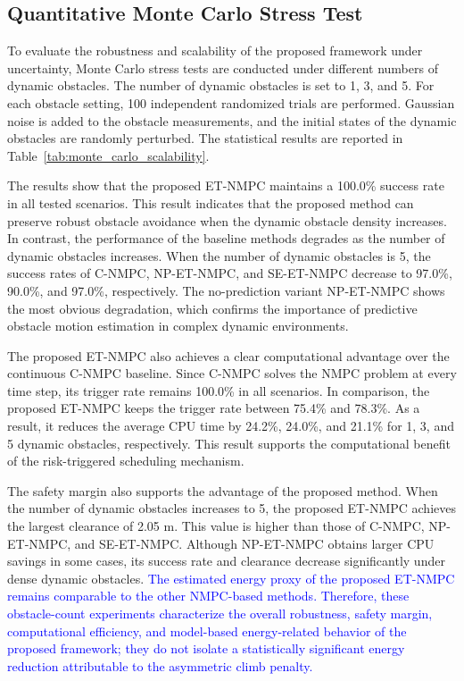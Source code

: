 \documentclass[lettersize,journal]{IEEEtran}
\begin{document}
\subsection{Quantitative Monte Carlo Stress Test}

To evaluate the robustness and scalability of the proposed framework under uncertainty, Monte Carlo stress tests are conducted under different numbers of dynamic obstacles. The number of dynamic obstacles is set to 1, 3, and 5. For each obstacle setting, 100 independent randomized trials are performed. Gaussian noise is added to the obstacle measurements, and the initial states of the dynamic obstacles are randomly perturbed. The statistical results are reported in Table~\ref{tab:monte_carlo_scalability}.

The results show that the proposed ET-NMPC maintains a 100.0\% success rate in all tested scenarios. This result indicates that the proposed method can preserve robust obstacle avoidance when the dynamic obstacle density increases. In contrast, the performance of the baseline methods degrades as the number of dynamic obstacles increases. When the number of dynamic obstacles is 5, the success rates of C-NMPC, NP-ET-NMPC, and SE-ET-NMPC decrease to 97.0\%, 90.0\%, and 97.0\%, respectively. The no-prediction variant NP-ET-NMPC shows the most obvious degradation, which confirms the importance of predictive obstacle motion estimation in complex dynamic environments.

The proposed ET-NMPC also achieves a clear computational advantage over the continuous C-NMPC baseline. Since C-NMPC solves the NMPC problem at every time step, its trigger rate remains 100.0\% in all scenarios. In comparison, the proposed ET-NMPC keeps the trigger rate between 75.4\% and 78.3\%. As a result, it reduces the average CPU time by 24.2\%, 24.0\%, and 21.1\% for 1, 3, and 5 dynamic obstacles, respectively. This result supports the computational benefit of the risk-triggered scheduling mechanism.

The safety margin also supports the advantage of the proposed method. When the number of dynamic obstacles increases to 5, the proposed ET-NMPC achieves the largest clearance of 2.05 m. This value is higher than those of C-NMPC, NP-ET-NMPC, and SE-ET-NMPC. Although NP-ET-NMPC obtains larger CPU savings in some cases, its success rate and clearance decrease significantly under dense dynamic obstacles. \textcolor{blue}{The estimated energy proxy of the proposed ET-NMPC remains comparable to the other NMPC-based methods. Therefore, these obstacle-count experiments characterize the overall robustness, safety margin, computational efficiency, and model-based energy-related behavior of the proposed framework; they do not isolate a statistically significant energy reduction attributable to the asymmetric climb penalty.}
\end{document}
